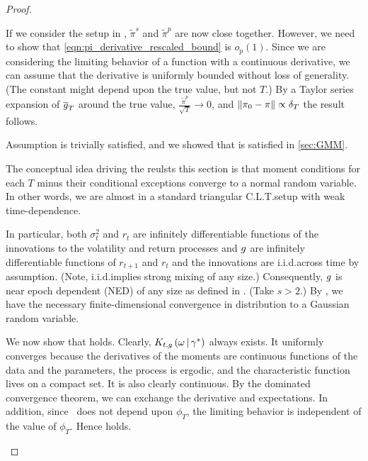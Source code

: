 \documentclass[11pt, letterpaper, twoside, final]{article}
\begin{document}
\begin{appendices}
\begin{proof}
\begin{proofpart}
    If we consider the setup in , $\tilde{\pi}^s$ and $\tilde{\pi}^p$ are now close together.
    However, we need to show that \cref{eqn:pi_derivative_rescaled_bound} is $o_p(1)$.
    Since we are considering the limiting behavior of a function with a continuous derivative, we can assume that
    the derivative is uniformly bounded without loss of generality. 
    (The constant might depend upon the true value, but not $T$.)
    By a Taylor series expansion of $\overline{g}_T$ around the true value, $\frac{\widetilde{\pi}^p}{\sqrt{T}} \to 0$,
    and $\lVert\pi_0 - \pi\rVert \propto \delta_T$ the result follows.

\end{proofpart}

\begin{proofpart}
    \label{part:mainTheoremProofPart3}

    Assumption  is trivially satisfied,  and we showed that  is satisfied
    in \cref{sec:GMM}.  
        
    The conceptual idea driving the reulsts this section is that moment conditions for each $T$ minus their
    conditional exceptions converge to a normal random variable.
    In other words, we are almost in a standard triangular C.L.T.\@ setup with weak time-dependence.

    In particular, both $\sigma^2_t$ and $r_t$ are infinitely differentiable functions of the innovations to
    the volatility and return processes and $g$ are infinitely differentiable functions of $r_{t+1}$ and
    $r_t$ and the innovations are i.i.d.\@ across time by assumption.
    (Note, i.i.d.\@ implies strong mixing of any size.)
    Consequently, $g$ is near epoch dependent (NED) of any size as defined in
    \textcite{andrews1991empirical}.  
    (Take $s>2.$) 
    By \textcite[Theorem 3]{andrews1991empirical}, we have the necessary finite-dimensional convergence in
    distribution to a Gaussian random variable. 

    We now show that  holds.
    Clearly, $K_{t,g}\left(\omega \,\middle\vert\, \gamma^{*}\right)$ always exists.
    It uniformly converges because the derivatives of the moments are continuous functions of the data and the
    parameters, the process is ergodic, and the characteristic function lives on a compact set.
    It is also clearly continuous.
    By the dominated convergence theorem, we can exchange the derivative and expectations.
    In addition, since \popmom\ does not depend upon $\phi_T$, the limiting behavior is independent of the value
    of $\phi_T$.
    Hence  holds.
    

\end{proofpart}
\end{proof}
\end{appendices}
\end{document}
